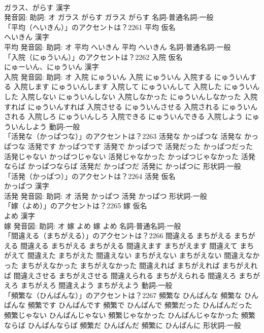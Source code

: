\documentclass[8pt]{extreport}
\begin{document}
\begin{CJK}{UTF8}{min}
\\	ガラス、がらす 漢字　
\\	発音図: 助詞: オ	ガラス がらす		ガラス がらす				名詞-普通名詞-一般 
\\	「平均（へいきん）」のアクセントは？2261	平均 仮名　
\\	へいきん 漢字　
\\	平均 発音図: 助詞: オ	平均 へいきん		平均 へいきん				名詞-普通名詞-一般 
\\	「入院（にゅういん）」のアクセントは？2262	入院 仮名　
\\	にゅーいん、にゅういん 漢字　
\\	入院 発音図: 助詞: オ	入院 にゅういん		入院 にゅういん 入院する にゅういんする 入院します にゅういんします 入院して にゅういんして 入院した にゅういんした 入院しない にゅういんしない 入院しなかった にゅういんしなかった 入院すれば にゅういんすれば 入院させる にゅういんさせる 入院される にゅういんされる 入院しろ にゅういんしろ 入院できる にゅういんできる 入院しよう にゅういんしよう				動詞-一般 
\\	「活発な（かっぱつな）」のアクセントは？2263		活発な かっぱつな		活発な かっぱつな 活発です かっぱつです 活発で かっぱつで 活発だった かっぱつだった 活発じゃない かっぱつじゃない 活発じゃなかった かっぱつじゃなかった 活発ならば かっぱつならば 活発だ かっぱつだ 活発に かっぱつに				形状詞-一般 
\\	「活発（かっぱつ）」のアクセントは？2264	活発 仮名　
\\	かっぱつ 漢字　
\\	活発 発音図: 助詞: オ	活発 かっぱつ		活発 かっぱつ				形状詞-一般 
\\	「嫁（よめ）」のアクセントは？2265	嫁 仮名　
\\	よめ 漢字　
\\	嫁 発音図: 助詞: オ	嫁 よめ		嫁 よめ				名詞-普通名詞-一般 
\\	「間違える（まちがえる）」のアクセントは？2266		間違える まちがえる まちがえる		間違える まちがえる まちがえる 間違えます まちがえます 間違えて まちがえて 間違えた まちがえた 間違えない まちがえない まちがえない 間違えなかった まちがえなかった まちがえなかった 間違えれば まちがえれば まちがえれば 間違えさせる まちがえさせる 間違えられる まちがえられる 間違えろ まちがえろ まちがえろ 間違えよう まちがえよう				動詞-一般 
\\	「頻繁な（ひんぱんな）」のアクセントは？2267		頻繁な ひんぱんな		頻繁な ひんぱんな 頻繁です ひんぱんです 頻繁で ひんぱんで 頻繁だった ひんぱんだった 頻繁じゃない ひんぱんじゃない 頻繁じゃなかった ひんぱんじゃなかった 頻繁ならば ひんぱんならば 頻繁だ ひんぱんだ 頻繁に ひんぱんに				形状詞-一般 

\end{CJK}
\end{document}
